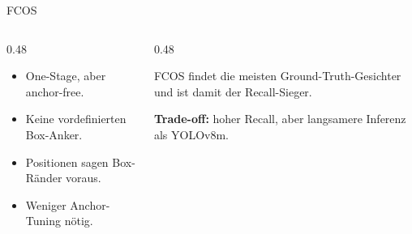 \begin{frame}{FCOS}
\small
\begin{columns}[T,onlytextwidth]
\begin{column}{0.48\textwidth}
\begin{itemize}
    \item One-Stage, aber anchor-free.
    \item Keine vordefinierten Box-Anker.
    \item Positionen sagen Box-Ränder voraus.
    \item Weniger Anchor-Tuning nötig.
\end{itemize}
\end{column}
\begin{column}{0.48\textwidth}
\begin{mynote}[Projektbefund]
\small
FCOS findet die meisten Ground-Truth-Gesichter und ist damit der Recall-Sieger.
\end{mynote}
\vspace{0.4em}
\scriptsize
\textbf{Trade-off:} hoher Recall, aber langsamere Inferenz als YOLOv8m.
\end{column}
\end{columns}
\end{frame}
